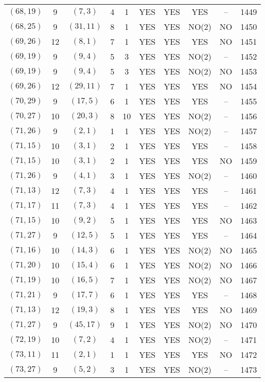 \begin{longtable}{|c|c|c|c|c|c|c|c|c|c|}
$(68, 19)$ & 9 & $(7, 3)$ & 4 & 1 & YES & YES & YES & -- & 1449\\
$(68, 25)$ & 9 & $(31, 11)$ & 8 & 1 & YES & YES & NO(2) & NO & 1450\\
$(69, 26)$ & 12 & $(8, 1)$ & 7 & 1 & YES & YES & YES & NO & 1451\\
$(69, 19)$ & 9 & $(9, 4)$ & 5 & 3 & YES & YES & NO(2) & -- & 1452\\
$(69, 19)$ & 9 & $(9, 4)$ & 5 & 3 & YES & YES & NO(2) & NO & 1453\\
$(69, 26)$ & 12 & $(29, 11)$ & 7 & 1 & YES & YES & YES & NO & 1454\\
$(70, 29)$ & 9 & $(17, 5)$ & 6 & 1 & YES & YES & YES & -- & 1455\\
$(70, 27)$ & 10 & $(20, 3)$ & 8 & 10 & YES & YES & NO(2) & -- & 1456\\
$(71, 26)$ & 9 & $(2, 1)$ & 1 & 1 & YES & YES & NO(2) & -- & 1457\\
$(71, 15)$ & 10 & $(3, 1)$ & 2 & 1 & YES & YES & YES & -- & 1458\\
$(71, 15)$ & 10 & $(3, 1)$ & 2 & 1 & YES & YES & YES & NO & 1459\\
$(71, 26)$ & 9 & $(4, 1)$ & 3 & 1 & YES & YES & NO(2) & -- & 1460\\
$(71, 13)$ & 12 & $(7, 3)$ & 4 & 1 & YES & YES & YES & -- & 1461\\
$(71, 17)$ & 11 & $(7, 3)$ & 4 & 1 & YES & YES & YES & -- & 1462\\
$(71, 15)$ & 10 & $(9, 2)$ & 5 & 1 & YES & YES & YES & NO & 1463\\
$(71, 27)$ & 9 & $(12, 5)$ & 5 & 1 & YES & YES & YES & -- & 1464\\
$(71, 16)$ & 10 & $(14, 3)$ & 6 & 1 & YES & YES & NO(2) & NO & 1465\\
$(71, 20)$ & 10 & $(15, 4)$ & 6 & 1 & YES & YES & NO(2) & NO & 1466\\
$(71, 19)$ & 10 & $(16, 5)$ & 7 & 1 & YES & YES & NO(2) & NO & 1467\\
$(71, 21)$ & 9 & $(17, 7)$ & 6 & 1 & YES & YES & YES & -- & 1468\\
$(71, 13)$ & 12 & $(19, 3)$ & 8 & 1 & YES & YES & YES & NO & 1469\\
$(71, 27)$ & 9 & $(45, 17)$ & 9 & 1 & YES & YES & NO(2) & NO & 1470\\
$(72, 19)$ & 10 & $(7, 2)$ & 4 & 1 & YES & YES & NO(2) & -- & 1471\\
$(73, 11)$ & 11 & $(2, 1)$ & 1 & 1 & YES & YES & YES & NO & 1472\\
$(73, 27)$ & 9 & $(5, 2)$ & 3 & 1 & YES & YES & NO(2) & -- & 1473\\

\end{longtable}
